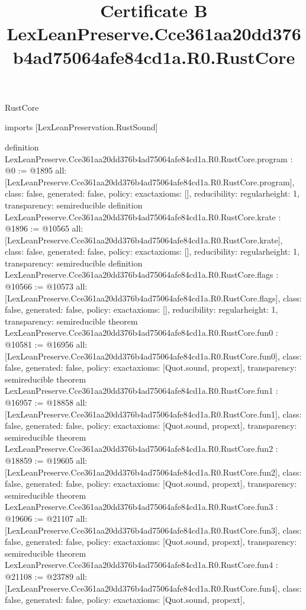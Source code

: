 \begin{lexlean}{RustCore}
\title{Certificate B LexLeanPreserve.Cce361aa20dd376b4ad75064afe84cd1a.R0.RustCore}
\begin{coremodule}
imports [LexLeanPreservation.RustSound]

definition LexLeanPreserve.Cce361aa20dd376b4ad75064afe84cd1a.R0.RustCore.program : @0 := @1895 {
  all: [LexLeanPreserve.Cce361aa20dd376b4ad75064afe84cd1a.R0.RustCore.program],
  class: false,
  generated: false,
  policy: exact{axioms: []},
  reducibility: regular{height: 1},
  transparency: semireducible
}
definition LexLeanPreserve.Cce361aa20dd376b4ad75064afe84cd1a.R0.RustCore.krate : @1896 := @10565 {
  all: [LexLeanPreserve.Cce361aa20dd376b4ad75064afe84cd1a.R0.RustCore.krate],
  class: false,
  generated: false,
  policy: exact{axioms: []},
  reducibility: regular{height: 1},
  transparency: semireducible
}
definition LexLeanPreserve.Cce361aa20dd376b4ad75064afe84cd1a.R0.RustCore.flags : @10566 := @10573 {
  all: [LexLeanPreserve.Cce361aa20dd376b4ad75064afe84cd1a.R0.RustCore.flags],
  class: false,
  generated: false,
  policy: exact{axioms: []},
  reducibility: regular{height: 1},
  transparency: semireducible
}
theorem LexLeanPreserve.Cce361aa20dd376b4ad75064afe84cd1a.R0.RustCore.fun0 : @10581 := @16956 {
  all: [LexLeanPreserve.Cce361aa20dd376b4ad75064afe84cd1a.R0.RustCore.fun0],
  class: false,
  generated: false,
  policy: exact{axioms: [Quot.sound, propext]},
  transparency: semireducible
}
theorem LexLeanPreserve.Cce361aa20dd376b4ad75064afe84cd1a.R0.RustCore.fun1 : @16957 := @18858 {
  all: [LexLeanPreserve.Cce361aa20dd376b4ad75064afe84cd1a.R0.RustCore.fun1],
  class: false,
  generated: false,
  policy: exact{axioms: [Quot.sound, propext]},
  transparency: semireducible
}
theorem LexLeanPreserve.Cce361aa20dd376b4ad75064afe84cd1a.R0.RustCore.fun2 : @18859 := @19605 {
  all: [LexLeanPreserve.Cce361aa20dd376b4ad75064afe84cd1a.R0.RustCore.fun2],
  class: false,
  generated: false,
  policy: exact{axioms: [Quot.sound, propext]},
  transparency: semireducible
}
theorem LexLeanPreserve.Cce361aa20dd376b4ad75064afe84cd1a.R0.RustCore.fun3 : @19606 := @21107 {
  all: [LexLeanPreserve.Cce361aa20dd376b4ad75064afe84cd1a.R0.RustCore.fun3],
  class: false,
  generated: false,
  policy: exact{axioms: [Quot.sound, propext]},
  transparency: semireducible
}
theorem LexLeanPreserve.Cce361aa20dd376b4ad75064afe84cd1a.R0.RustCore.fun4 : @21108 := @23789 {
  all: [LexLeanPreserve.Cce361aa20dd376b4ad75064afe84cd1a.R0.RustCore.fun4],
  class: false,
  generated: false,
  policy: exact{axioms: [Quot.sound, propext]},
}
\end{coremodule}
\end{lexlean}
